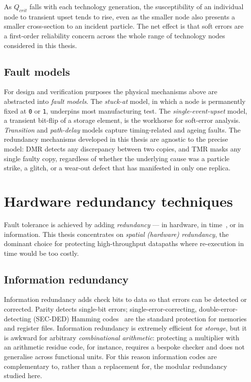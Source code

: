 As $Q_{crit}$ falls with each technology generation, the susceptibility of an
individual node to transient upset tends to rise, even as the smaller node also
presents a smaller cross-section to an incident particle. The net effect is that
soft errors are a first-order reliability concern across the whole range of
technology nodes considered in this thesis.

\subsection{Fault models}

For design and verification purposes the physical mechanisms above are abstracted
into \emph{fault models}. The \emph{stuck-at} model, in which a node is
permanently fixed at \texttt{0} or \texttt{1}, underpins most manufacturing
test. The \emph{single-event-upset} model, a transient bit-flip of a storage
element, is the workhorse for soft-error analysis. \emph{Transition} and
\emph{path-delay} models capture timing-related and ageing faults. The
redundancy mechanisms developed in this thesis are agnostic to the precise model:
DMR detects any discrepancy between two copies, and TMR masks any single faulty
copy, regardless of whether the underlying cause was a particle strike, a glitch,
or a wear-out defect that has manifested in only one replica.

\section{Hardware redundancy techniques}
\label{sec:redundancy}

Fault tolerance is achieved by adding \emph{redundancy} --- in hardware, in
time~\cite{nicolaidis}, or in information. This thesis concentrates on \emph{spatial (hardware)
redundancy}, the dominant choice for protecting high-throughput datapaths where
re-execution in time would be too costly.

\subsection{Information redundancy}

Information redundancy adds check bits to data so that errors can be detected or
corrected. Parity detects single-bit errors; single-error-correcting,
double-error-detecting (SEC-DED) Hamming codes~\cite{ecc-hamming} are the standard protection for
memories and register files. Information redundancy is extremely efficient for
\emph{storage}, but it is awkward for arbitrary \emph{combinational arithmetic}:
protecting a multiplier with an arithmetic residue code, for instance, requires
a bespoke checker and does not generalise across functional units. For this
reason information codes are complementary to, rather than a replacement for, the
modular redundancy studied here.

